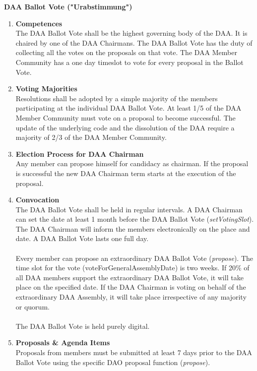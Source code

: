\item \textbf{DAA Ballot Vote ("Urabstimmung")} \\
\begin{enumerate}[label=\textbf{\arabic*.}]
    \item \textbf{Competences} \\
    The DAA Ballot Vote shall be the highest governing body of the DAA.
    It is chaired by one of the DAA Chairmans.
    The DAA Ballot Vote has the duty of collecting all the votes on the proposals on that vote.
    The DAA Member Community has a one day timeslot to vote for every proposal in the Ballot Vote.

    \item \textbf{Voting Majorities} \\
    Resolutions shall be adopted by a simple majority of the members participating at the individual DAA Ballot Vote.
    At least 1/5 of the DAA Member Community must vote on a proposal to become successful.
    The update of the underlying code and the dissolution of the DAA require a majority of 2/3 of the DAA Member Community.

    \item \textbf{Election Process for DAA Chairman} \\
    Any member can propose himself for candidacy as chairman.
    If the proposal is successful the new DAA Chairman term starts at the execution of the proposal.

    \item \textbf{Convocation} \\
    The DAA Ballot Vote shall be held in regular intervals.
    A DAA Chairman can set the date at least 1 month before the DAA Ballot Vote (\emph{setVotingSlot}).
    The DAA Chairman will inform the members electronically on the place and date.
    A DAA Ballot Vote lasts one full day. \\ \\

    Every member can propose an extraordinary DAA Ballot Vote (\emph{propose}). %
    The time slot for the vote (voteForGeneralAssemblyDate) is two weeks.
    If 20\% of all DAA members support the extraordinary DAA Ballot Vote, it will take place on the specified date.
    If the DAA Chairman is voting on behalf of the extraordinary DAA Assembly, it will take place irrespective of any majority or quorum. \\ \\
    The DAA Ballot Vote is held purely digital.

    \item \textbf{Proposals \& Agenda Items} \\
    Proposals from members must be submitted at least 7 days prior to the DAA Ballot Vote using the specific DAO proposal function (\emph{propose}).
\end{enumerate}



